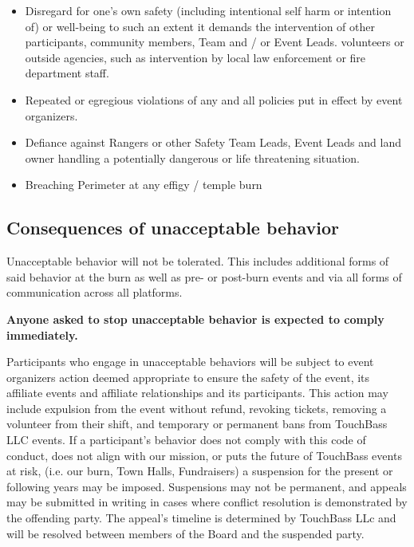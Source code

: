 \begin{itemize}[noitemsep]
	\item Disregard for one’s own safety (including intentional self harm or intention of) or well-being to such an extent it demands the intervention of other participants, community members, Team and / or Event Leads. volunteers or outside agencies, such as intervention by local law enforcement or fire department staff.
    
	\item Repeated or egregious violations of any and all policies put in effect by event organizers.
    
    \item Defiance against Rangers or other Safety Team Leads, Event Leads and land owner handling a potentially dangerous or life threatening situation.
    
    \item Breaching Perimeter at any effigy / temple burn
\end{itemize}

\subsection*{Consequences of unacceptable behavior}
Unacceptable behavior will not be tolerated. This includes additional forms of said behavior at the burn as well as pre- or post-burn events and via all forms of communication across all platforms.

\textbf{Anyone asked to stop unacceptable behavior is expected to comply immediately.}

Participants who engage in unacceptable behaviors will be subject to event organizers action deemed appropriate to ensure the safety of the event, its affiliate events and affiliate relationships and its participants.
This action may include expulsion from the event without refund, revoking tickets, removing a volunteer from their shift, and temporary or permanent bans from TouchBass LLC events.
\ifisflight
\newpage
\fi
If a participant’s behavior does not comply with this code of conduct, does not align with our mission, or puts the future of TouchBass events at risk, (i.e. our burn, Town Halls, Fundraisers) a suspension for the present or following years may be imposed.
Suspensions may not be permanent, and appeals may be submitted in writing in cases where conflict resolution is demonstrated by the offending party. The appeal’s timeline is determined by TouchBass LLc and will be resolved between members of the Board and the suspended party.

